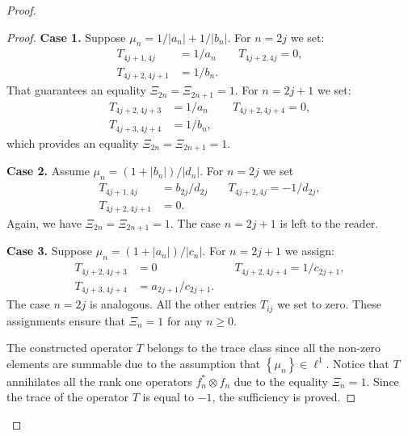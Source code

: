 \documentclass[12pt]{amsart}
\theoremstyle{case}
\begin{document}
\begin{proof}
\begin{proof}
        \noindent\textbf{Case 1.}
        Suppose $\mu_n = 1/|a_n| + 1/|b_n|$.
        For $n=2j$ we set:
        \begin{align*}
          T_{4j+1,4j}&=1/a_n & \quad T_{4j+2,4j} = 0,\\
          T_{4j+2,4j+1}&=1/b_n.
        \end{align*}
        That guarantees an equality $\Xi_{2n} = \Xi_{2n+1} = 1$.
        For $n=2j+1$ we set:
        \begin{align*}
          T_{4j+2,4j+3}&=1/a_n & \quad T_{4j+2,4j+4} = 0,\\
          T_{4j+3,4j+4}&=1/b_n,
        \end{align*}
        which provides an equality $\Xi_{2n} = \Xi_{2n+1} = 1$.

        \noindent\textbf{Case 2.}
        Assume $\mu_n = (1 + |b_n|)/|d_n|$. 
        For $n=2j$ we set
        \begin{align*}
          T_{4j+1,4j} &= b_{2j}/d_{2j} & \quad T_{4j+2,4j} = -1/d_{2j},\\
          T_{4j+2,4j+1} &= 0.
        \end{align*}
        Again, we have $\Xi_{2n} = \Xi_{2n+1} = 1$.
        The case $n = 2j + 1$ is left to the reader.

        \noindent\textbf{Case 3.}
        Suppose $\mu_n = (1 + |a_n|)/|c_n|$. 
        For $n = 2j + 1$ we assign:
        \begin{align*}
          T_{4j+2,4j+3} &= 0 & \quad T_{4j+2,4j+4} = 1/c_{2j+1},\\
          T_{4j+3,4j+4} &= a_{2j+1}/c_{2j+1}.
        \end{align*}
        The case $n = 2j$ is analogous.
        \medskip
        All the other entries $T_{ij}$ we set to zero.
        These assignments ensure that $\Xi_n = 1$ for any $n \geq 0$.

        The constructed operator $T$ belongs to the trace class since all the non-zero elements are summable 
          due to the assumption that $\left\{\mu_n\right\} \in \ell^1$.
        Notice that $T$ annihilates all the rank one operators $f^*_n \otimes f_n$ due to the equality $\Xi_n = 1$.
        Since the trace of the operator $T$ is equal to $-1$, the sufficiency is proved.


\end{proof}
\end{proof}
\end{document}
